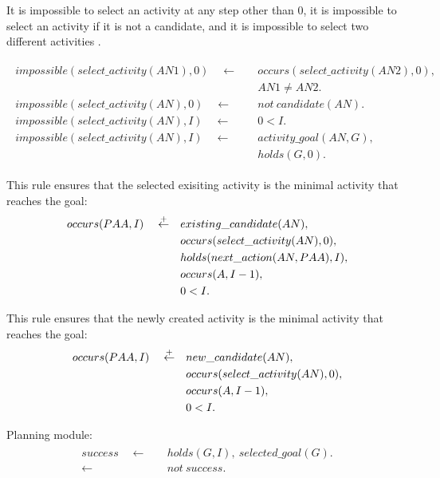 \documentclass[11pt, oneside]{article}
\begin{document}
It is impossible to select an activity at any step other than 0, it is impossible to select an activity if it is not a candidate, and it is impossible to select two different activities .

\begin{align}\begin{split}
impossible(select\_activity(AN1),0) \quad \leftarrow \quad &occurs(select\_activity(AN2),0),\\ &AN1\neq AN2.\\
impossible(select\_activity(AN),0) \quad \leftarrow \quad &not\ candidate(AN).\\
impossible(select\_activity(AN),I) \quad \leftarrow \quad &0<I.\\
impossible(select\_activity(AN),I) \quad \leftarrow \quad &activity\_goal(AN,G),\\ &holds(G,0).
\end{split}\end{align}



This rule ensures that the selected exisiting activity is the minimal activity that reaches the goal:
\begin{align}\begin{split}
occurs(PAA,I) \quad \stackrel{\mathclap{\scriptsize\mbox{+}}}{\leftarrow}  \quad 
&existing\_candidate(AN),\\
&occurs(select\_activity(AN),0),\\
&holds(next\_action(AN,PAA),I),\\
&occurs(A,I-1),\\
&0<I.
\end{split}\end{align}


This rule ensures that the newly created activity is the minimal activity that reaches the goal:
\begin{align}\begin{split}
occurs(PAA,I) \quad \stackrel{\mathclap{\scriptsize\mbox{+}}}{\leftarrow}  \quad 
&new\_candidate(AN),\\
&occurs(select\_activity(AN),0),\\
&occurs(A,I-1),\\
&0<I.
\end{split}\end{align}


Planning module:
\begin{align}\begin{split}
success \quad \leftarrow \quad &holds(G,I),\ selected\_goal(G).\\
\leftarrow \quad &not\ success.
\end{split}\end{align}


 
 

%
%
 
 
 
\end{document}
